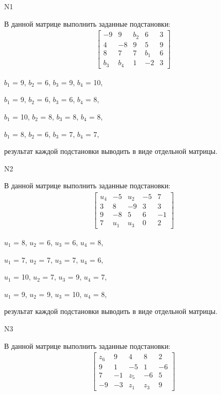 \documentclass[11pt]{report}
\begin{document}
\pagestyle{empty}

N1

В данной матрице выполнить заданные подстановки:
\begin{align*}
\left[\begin{matrix}-9 & 9 & b_{2} & 6 & 3\\4 & -8 & 9 & 5 & 9\\8 & 7 & 7 & b_{1} & 6\\b_{3} & b_{4} & 1 & -2 & 3\end{matrix}\right]
\end{align*}


$b_{1}$ = 9, $b_{2}$ = 6, $b_{3}$ = 9, $b_{4}$ = 10, 

$b_{1}$ = 9, $b_{2}$ = 6, $b_{3}$ = 6, $b_{4}$ = 8, 

$b_{1}$ = 10, $b_{2}$ = 8, $b_{3}$ = 8, $b_{4}$ = 8, 

$b_{1}$ = 8, $b_{2}$ = 6, $b_{3}$ = 7, $b_{4}$ = 7, 

результат каждой подстановки выводить в виде отдельной матрицы.

N2

В данной матрице выполнить заданные подстановки:
\begin{align*}
\left[\begin{matrix}u_{4} & -5 & u_{2} & -5 & 7\\3 & 8 & -9 & 3 & 3\\9 & -8 & 5 & 6 & -1\\7 & u_{1} & u_{3} & 0 & 2\end{matrix}\right]
\end{align*}


$u_{1}$ = 8, $u_{2}$ = 6, $u_{3}$ = 6, $u_{4}$ = 8, 

$u_{1}$ = 7, $u_{2}$ = 7, $u_{3}$ = 7, $u_{4}$ = 6, 

$u_{1}$ = 10, $u_{2}$ = 7, $u_{3}$ = 9, $u_{4}$ = 7, 

$u_{1}$ = 9, $u_{2}$ = 9, $u_{3}$ = 10, $u_{4}$ = 8, 

результат каждой подстановки выводить в виде отдельной матрицы.

N3

В данной матрице выполнить заданные подстановки:
\begin{align*}
\left[\begin{matrix}z_{6} & 9 & 4 & 8 & 2\\9 & 1 & -5 & 1 & -6\\7 & -1 & z_{5} & -6 & 5\\-9 & -3 & z_{1} & z_{3} & 9\end{matrix}\right]
\end{align*}
\end{document}
